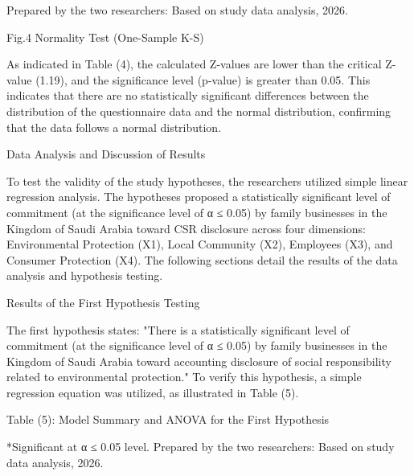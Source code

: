 \documentclass[10pt]{NSP1}
\begin{document}
Prepared by the two researchers: Based on study data analysis, 2026.

Fig.4 Normality Test (One-Sample K-S)

As indicated in Table (4), the calculated Z-values are lower than the critical Z-value (1.19), and the significance level (p-value) is greater than 0.05. This indicates that there are no statistically significant differences between the distribution of the questionnaire data and the normal distribution, confirming that the data follows a normal distribution.

Data Analysis and Discussion of Results

To test the validity of the study hypotheses, the researchers utilized simple linear regression analysis. The hypotheses proposed a statistically significant level of commitment (at the significance level of α ≤ 0.05) by family businesses in the Kingdom of Saudi Arabia toward CSR disclosure across four dimensions: Environmental Protection (X1), Local Community (X2), Employees (X3), and Consumer Protection (X4). The following sections detail the results of the data analysis and hypothesis testing.

Results of the First Hypothesis Testing

The first hypothesis states: "There is a statistically significant level of commitment (at the significance level of α ≤ 0.05) by family businesses in the Kingdom of Saudi Arabia toward accounting disclosure of social responsibility related to environmental protection." To verify this hypothesis, a simple regression equation was utilized, as illustrated in Table (5).

Table (5): Model Summary and ANOVA for the First Hypothesis

\begin{table}[htbp]
\centering
{}
\caption{}

\end{table}

*Significant at α ≤ 0.05 level. Prepared by the two researchers: Based on study data analysis, 2026.
\end{document}
